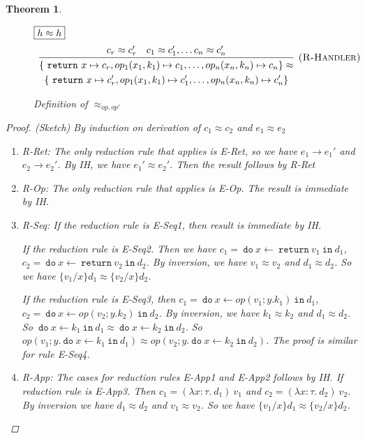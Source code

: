 \documentclass{article}
\newtheorem{theorem}{Theorem}[section]
\theoremstyle{definition}
\newcommand{\m}[1]{\ \texttt{#1}\ }
\begin{document}
\begin{theorem}
\begin{figure}[H]
{$\fbox{$h \approx h$}$
\[
\begin{array}{c}
\infer[\textsc{(R-Handler)}]{\begin{gathered} \{\m{return} x \mapsto c_r, op_1(x_1, k_1) \mapsto c_1, \dots, op_n(x_n, k_n) \mapsto c_n\} \approx \\\{\m{return} x \mapsto c_r', op_1(x_1, k_1) \mapsto c_1', \dots, op_n(x_n, k_n) \mapsto c_n'\}  
 \end{gathered} }{ c_r \approx c_r' & c_1 \approx c_1', \dots c_n \approx c_n'} 
\end{array}
\]


}
\caption{Definition of $\approx_{op, op'}$}
\end{figure}




\begin{proof}(Sketch) By induction on derivation of $c_1 \approx c_2$ and $e_1 \approx e_2$
\begin{enumerate}
\item R-Ret:
  The only reduction rule that applies is E-Ret, so we have $e_1 \longrightarrow e_1'$ and $e_2 \longrightarrow e_2'$. By IH, we have $e_1' \approx e_2'$. Then the result follows by R-Ret
\item R-Op: The only reduction rule that applies is E-Op. The result is immediate by IH.
\item R-Seq: If the reduction rule is E-Seq1, then result is immediate by IH. 

If the reduction rule is E-Seq2. Then we have $c_1 = \m{do} x \leftarrow \m{return} v_1 \m{in} d_1$, $c_2 = \m{do} x \leftarrow \m{return} v_2 \m{in} d_2$. By inversion, we have $v_1 \approx v_2$ and $d_1 \approx d_2$. So we have $\{v_1/x\}d_1 \approx \{v_2/x\}d_2$.

If the reduction rule is E-Seq3, then $c_1 = \m{do} x \leftarrow op(v_1; y. k_1) \m{in} d_1$, $c_2= \m{do} x \leftarrow op(v_2; y. k_2) \m{in} d_2$. By inversion, we have $k_1 \approx k_2$ and $d_1 \approx d_2$. So $\m{do} x \leftarrow k_1 \m{in} d_1 \approx \m{do} x \leftarrow k_2 \m{in} d_2$. So $op(v_1; y. \m{do} x \leftarrow k_1 \m{in} d_1) \approx op(v_2; y. \m{do} x \leftarrow k_2 \m{in} d_2)$. The proof is similar for rule E-Seq4.

\item R-App: The cases for reduction rules E-App1 and E-App2 follows by IH. If reduction rule is E-App3. Then $c_1 = (\lambda x:\tau.\ d_1)\ v_1$ and $c_2 = (\lambda x:\tau.\ d_2)\ v_2$. By inversion we have $d_1 \approx d_2$ and $v_1 \approx v_2$. So we have $\{v_1/x\}d_1 \approx \{v_2/x\}d_2$.


\end{enumerate}
\end{proof}
\end{theorem}
\end{document}
